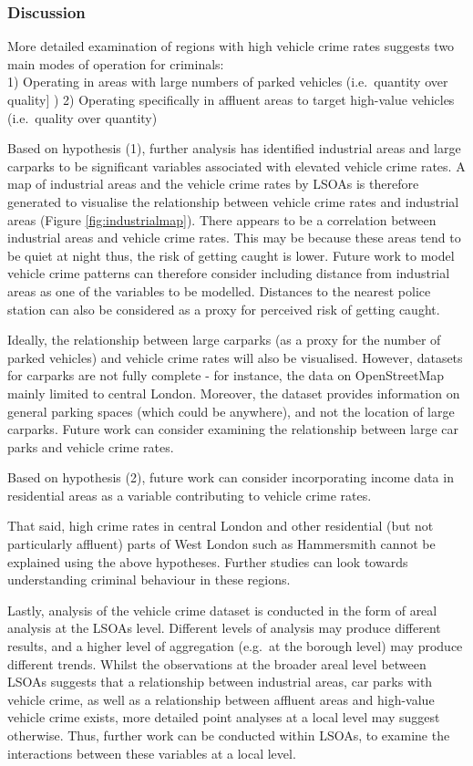 \documentclass[]{article}
\theoremstyle{definition}
\theoremstyle{definition}
\theoremstyle{definition}
\theoremstyle{remark}
\begin{document}
\subsubsection{Discussion}\label{discussion}

More detailed examination of regions with high vehicle crime rates
suggests two main modes of operation for criminals:\\
1) Operating in areas with large numbers of parked vehicles
(i.e.~quantity over quality{]} ) 2) Operating specifically in affluent
areas to target high-value vehicles (i.e.~quality over quantity)

Based on hypothesis (1), further analysis has identified industrial
areas and large carparks to be significant variables associated with
elevated vehicle crime rates. A map of industrial areas and the vehicle
crime rates by LSOAs is therefore generated to visualise the
relationship between vehicle crime rates and industrial areas (Figure
\ref{fig:industrialmap}). There appears to be a correlation between
industrial areas and vehicle crime rates. This may be because these
areas tend to be quiet at night thus, the risk of getting caught is
lower. Future work to model vehicle crime patterns can therefore
consider including distance from industrial areas as one of the
variables to be modelled. Distances to the nearest police station can
also be considered as a proxy for perceived risk of getting caught.

Ideally, the relationship between large carparks (as a proxy for the
number of parked vehicles) and vehicle crime rates will also be
visualised. However, datasets for carparks are not fully complete - for
instance, the data on OpenStreetMap mainly limited to central London.
Moreover, the dataset provides information on general parking spaces
(which could be anywhere), and not the location of large carparks.
Future work can consider examining the relationship between large car
parks and vehicle crime rates.

Based on hypothesis (2), future work can consider incorporating income
data in residential areas as a variable contributing to vehicle crime
rates.

That said, high crime rates in central London and other residential (but
not particularly affluent) parts of West London such as Hammersmith
cannot be explained using the above hypotheses. Further studies can look
towards understanding criminal behaviour in these regions.

Lastly, analysis of the vehicle crime dataset is conducted in the form
of areal analysis at the LSOAs level. Different levels of analysis may
produce different results, and a higher level of aggregation (e.g.~at
the borough level) may produce different trends. Whilst the observations
at the broader areal level between LSOAs suggests that a relationship
between industrial areas, car parks with vehicle crime, as well as a
relationship between affluent areas and high-value vehicle crime exists,
more detailed point analyses at a local level may suggest otherwise.
Thus, further work can be conducted within LSOAs, to examine the
interactions between these variables at a local level.
\end{document}

